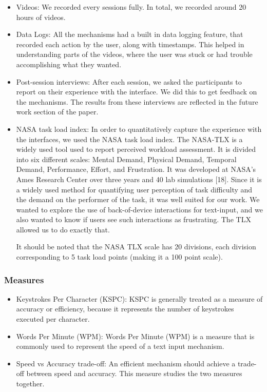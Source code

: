 \begin{itemize}
\item Videos: We recorded every sessions fully. In total, we recorded
  around 20 hours of videos.
\item Data Logs: All the mechanisms had a built in data logging
  feature, that recorded each action by the user, along with
  timestamps. This helped in understanding parts of the videos, where
  the user was stuck or had trouble accomplishing what they wanted.
\item Post-session interviews: After each session, we asked the
  participants to report on their experience with the interface. We
  did this to get feedback on the mechanisms.  The results from
  these interviews are reflected in the future work section of the
  paper.
\item NASA task load index: In order to quantitatively capture the
  experience with the interfaces, we used the NASA task load
  index. The NASA-TLX is a widely used tool used to report perceived
  workload assessment. It is divided into six different scales: Mental
  Demand, Physical Demand, Temporal Demand, Performance, Effort, and
  Frustration. It was developed at NASA's Ames Research Center over
  three years and 40 lab simulations [18]. Since it is a widely used
  method for quantifying user perception of task difficulty and the
  demand on the performer of the task, it was well suited for our
  work. We wanted to explore the use of back-of-device interactions
  for text-input, and we also wanted to know if users see such
  interactions as frustrating. The TLX allowed us to do exactly that.

  It should be noted that the NASA TLX scale has 20 divisions, each
  division corresponding to 5 task load points (making it a 100 point
  scale).

\end{itemize}


\subsubsection{Measures}
\begin{itemize}
\item Keystrokes Per Character (KSPC): KSPC is generally treated as a
  measure of accuracy or efficiency, because it represents the number of keystrokes
  executed per character.  
\item Words Per Minute (WPM): Words Per Minute (WPM) is a measure that
  is commonly used to represent the speed of a text input mechanism.
\item Speed vs Accuracy trade-off: An efficient mechanism should
  achieve a trade-off between speed and accuracy. This measure studies
  the two measures together.
\end{itemize}

